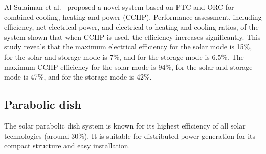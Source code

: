 Al-Sulaiman et al.~\cite{AlSulaiman2012} proposed a novel system based on PTC and ORC for combined cooling, heating and power (CCHP). Performance assessment, including efficiency, net electrical power, and electrical to heating and cooling ratios, of the system shown that when CCHP is used, the efficiency increases significantly. This study reveals that the maximum electrical efficiency for the solar mode is 15\%, for the solar and storage mode is 7\%, and for the storage mode is 6.5\%. The maximum CCHP efficiency for the solar mode is 94\%, for the solar and storage mode is 47\%, and for the storage mode is 42\%.

\subsection{Parabolic dish}
\label{sec:pd}

The solar parabolic dish system is known for its highest efficiency of all solar technologies (around 30\%). It is suitable for distributed power generation for its compact structure and easy installation.  

